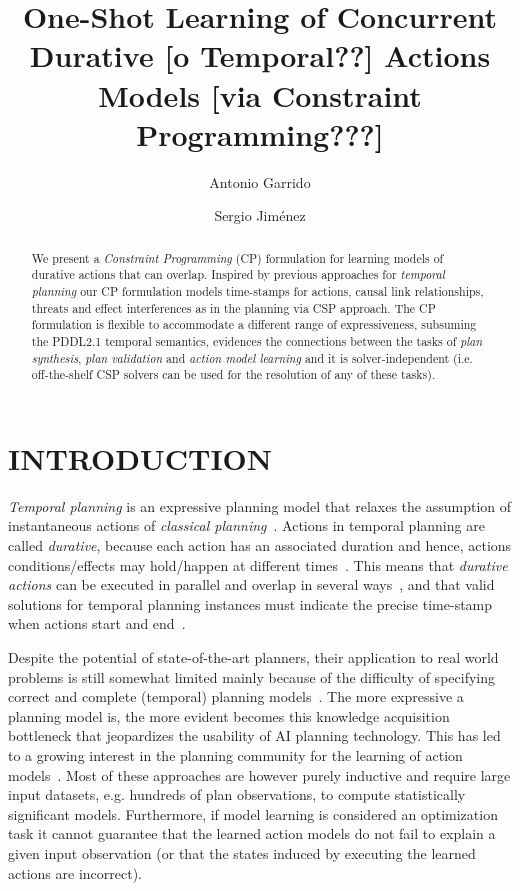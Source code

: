 \documentclass{ecai}
\begin{document}
\title{One-Shot Learning of Concurrent Durative [o Temporal??] Actions Models [via Constraint Programming???]}
\author{Antonio Garrido \and Sergio Jim\'enez}
 
 
\maketitle

\begin{abstract}
  We present a {\em Constraint Programming} (CP) formulation for learning models of durative actions that can overlap. Inspired by previous approaches for {\em temporal planning} our CP formulation models time-stamps for actions, causal link relationships, threats and effect interferences as in the planning via CSP approach.  The CP formulation is flexible to accommodate a different range of expressiveness, subsuming the PDDL2.1 temporal semantics, evidences the connections between the tasks of {\em plan synthesis}, {\em plan validation} and {\em action model learning} and it is solver-independent (i.e. off-the-shelf CSP solvers can be used for the resolution of any of these tasks).
\end{abstract}



\section{INTRODUCTION}

{\em Temporal planning} is an expressive planning model that relaxes the assumption of instantaneous actions of {\em classical planning}~\cite{geffner2013concise}. Actions in temporal planning are called {\em durative}, because each action has an associated duration and hence, actions conditions/effects may hold/happen at different times~\cite{fox2003pddl2}. This means that {\em durative actions} can be executed in parallel and overlap in several ways~\cite{cushing2007temporal}, and that valid solutions for temporal planning instances must indicate the precise time-stamp when actions start and end~\cite{howey2004val}.

Despite the potential of state-of-the-art planners, their application to real world problems is still somewhat limited mainly because of the difficulty of specifying correct and complete (temporal) planning models~\cite{kambhampati2007model}. The more expressive a planning model is, the more evident becomes this knowledge acquisition bottleneck that jeopardizes the usability of AI planning technology. This has led to a growing interest in the planning community for the learning of action models~\cite{kuvcera2018louga,MouraoZPS12,yang2007learning,zhuo2013action}. Most of these approaches are however purely inductive and require large input datasets, e.g. hundreds of plan observations, to compute statistically significant models. Furthermore, if model learning is considered an optimization task it cannot guarantee that the learned action models do not fail to explain a given input observation (or that the states induced by executing the learned actions are incorrect).
\end{document}

